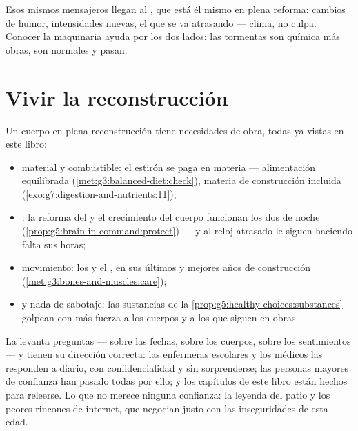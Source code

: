 \begin{remark}\label{rem:g8:puberty:moods}
Esos mismos mensajeros llegan al , que está él mismo en plena
reforma: cambios de humor, intensidades nuevas, el  que se va
atrasando --- clima, no culpa. Conocer la maquinaria ayuda por los dos
lados: las tormentas son química más obras, son normales y pasan.
\end{remark}

\section{Vivir la reconstrucción}

\begin{proposition}\label{prop:g8:puberty:care}
Un cuerpo en plena reconstrucción tiene necesidades de obra, todas ya
vistas en este libro:
\begin{itemize}
  \item material y combustible: el estirón se paga en materia ---
        alimentación equilibrada
        (\cref{met:g3:balanced-diet:check}), materia de construcción
        incluida (\cref{exo:g7:digestion-and-nutrients:11});
  \item {}: la reforma del  y el crecimiento del cuerpo
        funcionan los dos de noche
        (\cref{prop:g5:brain-in-command:protect}) --- y al reloj
        atrasado le siguen haciendo falta sus horas;
  \item movimiento: los  y el , en sus últimos y mejores
        años de construcción
        (\cref{met:g3:bones-and-muscles:care});
  \item y nada de sabotaje: las sustancias de la
        \cref{prop:g5:healthy-choices:substances} golpean con más
        fuerza a los cuerpos y a los  que siguen en obras.
\end{itemize}
\end{proposition}
\admitted

\begin{example}\label{ex:g8:puberty:questions}
La  levanta preguntas --- sobre las fechas, sobre los cuerpos,
sobre los sentimientos --- y tienen su dirección correcta: las
enfermeras escolares y los médicos las responden a diario, con
confidencialidad y sin sorprenderse; las personas mayores de confianza
han pasado todas por ello; y los capítulos de este libro están hechos
para releerse. Lo que no merece ninguna confianza: la leyenda del patio
y los peores rincones de internet, que negocian justo con las
inseguridades de esta edad.
\end{example}

